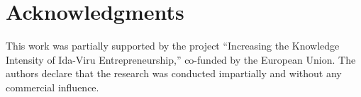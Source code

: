 \documentclass[preprint,12pt,authoryear]{elsarticle}
\begin{document}
%
%
%
%
%
%


\section*{Acknowledgments}
This work was partially supported by the project “Increasing the Knowledge Intensity of Ida-Viru Entrepreneurship,” co-funded by the European Union. The authors declare that the research was conducted impartially and without any commercial influence.


\end{document}
